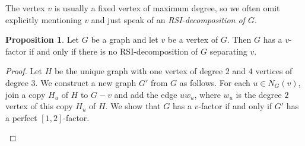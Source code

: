 \documentclass[a4paper,11pt,oneside]{scrartcl}
\theoremstyle{definition}
\newtheorem{proposition}[definition]{Proposition}
\theoremstyle{remark}
\begin{document}
The vertex $v$ is usually a fixed vertex of maximum degree, so we often omit explicitly mentioning $v$ and just speak of an \emph{RSI-decomposition of $G$}. 

\begin{proposition}\label{proposition:v-factor_RSI-decomp}
    Let $G$ be a graph and let $v$ be a vertex of $G$. Then $G$ has a $v$-factor if and only if there is no RSI-decomposition of $G$ separating $v$. 
\end{proposition}
\begin{proof}
    Let $H$ be the unique graph with one vertex of degree $2$ and $4$ vertices of degree $3$. We construct a new graph $G'$ from $G$ as follows. For each $u\in N_G(v)$, join a copy $H_u$ of $H$ to $G-v$ and add the edge $uw_u$, where $w_u$ is the degree $2$ vertex of this copy $H_u$ of $H$. We show that $G$ has a $v$-factor if and only if $G'$ has a perfect $[1,2]$-factor.

    \begin{figure}[ht]
        \centering
\end{figure}
\end{proof}
\end{document}
